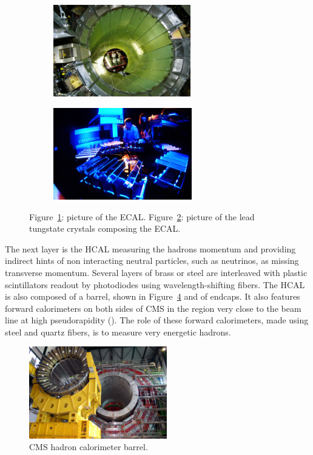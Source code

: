 	\begin{figure}[H]
		\begin{subfigure}{0.5\linewidth}
			\centering
			\includegraphics[height = 4cm]{fig/chapt2/ECAL_barrel.jpg}
			\caption{\label{fig:ECAL:A}}
		\end{subfigure}
		\begin{subfigure}{0.5\linewidth}
			\centering
			\includegraphics[height = 4cm]{fig/chapt2/ECAL_crystals.jpg}
			\caption{\label{fig:ECAL:B}}
		\end{subfigure}
		\caption{\label{fig:ECAL} Figure~\ref{fig:ECAL:A}: picture of the ECAL. Figure~\ref{fig:ECAL:B}: picture of the lead tungstate crystals composing the ECAL.}
	\end{figure}
	
	The next layer is the HCAL measuring the hadrons momentum and providing indirect hints of non interacting neutral particles, such as neutrinos, as missing transverse momentum. Several layers of brass or steel are interleaved with plastic scintillators readout by photodiodes using wavelength-shifting fibers. The HCAL is also composed of a barrel, shown in Figure~\ref{fig:HCAL} and of endcaps. It also features forward calorimeters on both sides of CMS in the region very close to the beam line at high pseudorapidity (). The role of these forward calorimeters, made using steel and quartz fibers, is to measure very energetic hadrons.
	
	\begin{figure}[H]
		\centering
		\includegraphics[height = 4cm]{fig/chapt2/HCAL.jpg}
		\caption{\label{fig:HCAL} CMS hadron calorimeter barrel.}
	\end{figure}
	
